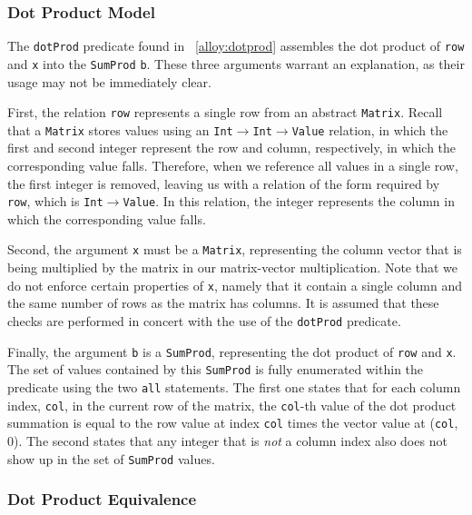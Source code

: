 \subsubsection{Dot Product Model}
\label{sec:dotprod}

The \texttt{dotProd} predicate found in \figurename~\ref{alloy:dotprod} assembles the dot product of \texttt{row} and \texttt{x} into the \texttt{SumProd} \texttt{b}.  These three arguments warrant an explanation, as their usage may not be immediately clear.

First, the relation \texttt{row} represents a single row from an abstract \texttt{Matrix}.  Recall that a \texttt{Matrix} stores values using an \texttt{Int$\rightarrow$Int$\rightarrow$Value} relation, in which the first and second integer represent the row and column, respectively, in which the corresponding value falls.  Therefore, when we reference all values in a single row, the first integer is removed, leaving us with a relation of the form required by \texttt{row}, which is \texttt{Int$\rightarrow$Value}.  In this relation, the integer represents the column in which the corresponding value falls.

Second, the argument \texttt{x} must be a \texttt{Matrix}, representing the column vector that is being multiplied by the matrix in our matrix-vector multiplication.  Note that we do not enforce certain properties of \texttt{x}, namely that it contain a single column and the same number of rows as the matrix has columns.  It is assumed that these checks are performed in concert with the use of the \texttt{dotProd} predicate.

Finally, the argument \texttt{b} is a \texttt{SumProd}, representing the dot product of \texttt{row} and \texttt{x}.  The set of values contained by this \texttt{SumProd} is fully enumerated within the predicate using the two \texttt{all} statements.  The first one states that for each column index, \texttt{col}, in the current row of the matrix, the \texttt{col}-th value of the dot product summation is equal to the row value at index \texttt{col} times the vector value at (\texttt{col}, 0).  The second states that any integer that is \emph{not} a column index also does not show up in the set of \texttt{SumProd} values.

\subsubsection{Dot Product Equivalence}
\label{sec:valeqv}

